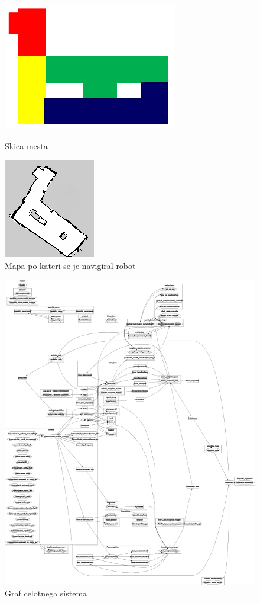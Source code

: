 \documentclass[a4paper,11pt]{article}
\begin{document}
\begin{figure}[!tbp]
  \centering
  \begin{minipage}[b]{0.4\textwidth}
	\includegraphics[scale=1]{city.png}
	\caption{Skica mesta}
  \end{minipage}
  \hfill
  \begin{minipage}[b]{0.4\textwidth}
	\includegraphics[scale=1]{robotMap.png}
	\caption{Mapa po kateri se je navigiral robot}
  \end{minipage}
\end{figure}

\pagebreak
\begin{figure}[h]
\begin{center}
\includegraphics[scale=0.1]{systemGraph.png}
\caption{Graf celotnega sistema}
\label{systemGraph}
\end{center}
\end{figure}
\end{document}
